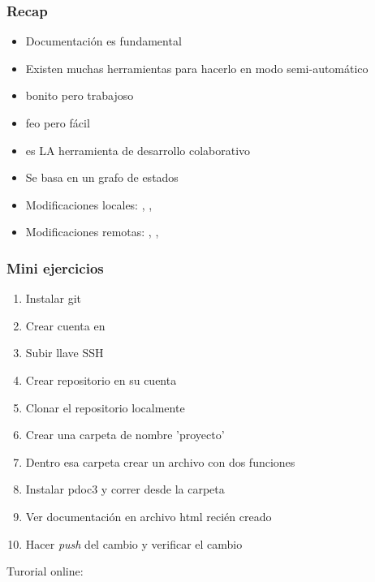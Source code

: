 \documentclass[14pt,aspectratio=169,xcolor=dvipsnames]{beamer}
\begin{document}
\begin{frame}\frametitle{Recap}
    \begin{itemize}
        \item Documentación es fundamental
        \item Existen muchas herramientas para hacerlo en modo semi-automático
        \item {} bonito pero trabajoso
        \item {} feo pero fácil
        \item {} es LA herramienta de desarrollo colaborativo
        \item Se basa en un grafo de estados
        \item Modificaciones locales: , , 
        \item Modificaciones remotas: , , 
    \end{itemize}
\end{frame}
\begin{frame}
    \maketitle
\end{frame}
\begin{frame}[noframenumbering]\frametitle{Mini ejercicios}
    \begin{enumerate}
        \item Instalar git
        \item Crear cuenta en 
        \item Subir llave SSH
        \item Crear repositorio en su cuenta
        \item Clonar el repositorio localmente
        \item Crear una carpeta de nombre 'proyecto'
        \item Dentro esa carpeta crear un archivo con dos funciones
        \item Instalar pdoc3 y correr  desde la carpeta
        \item Ver documentación en archivo html recién creado

        \item Hacer \emph{push} del cambio y verificar el cambio
    \end{enumerate}
    
    \begin{center}
        Turorial online: 
    \end{center}
\end{frame}
\begin{frame}
    \maketitle
\end{frame}
\end{document}
